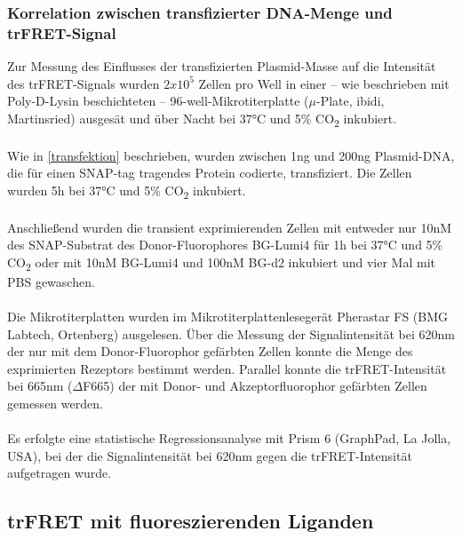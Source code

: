 \subsubsection{Korrelation zwischen transfizierter DNA-Menge und trFRET-Signal}
Zur Messung des Einflusses der transfizierten Plasmid-Masse auf die Intensität des trFRET-Signals wurden $2x10^5$ Zellen pro Well in einer -- wie beschrieben mit Poly-D-Lysin beschichteten -- 96-well-Mikrotiterplatte ($\mu$-Plate, ibidi, Martinsried) ausgesät und über Nacht bei 37\si{\celsius} und 5\% CO\textsubscript{2} inkubiert.
\\ \\
Wie in \ref{transfektion} beschrieben, wurden zwischen 1\si{\nano\gram} und 200\si{\nano\gram} Plasmid-DNA, die für einen SNAP-tag tragendes Protein codierte, transfiziert. Die Zellen wurden 5\si{\hour} bei 37\si{\celsius} und 5\% CO\textsubscript{2} inkubiert.
\\ \\
Anschließend wurden die transient exprimierenden Zellen mit entweder nur 10\si{\nano M} des SNAP-Substrat des Donor-Fluorophores BG-Lumi4 für 1\si{\hour} bei 37\si{\celsius} und 5\% CO\textsubscript{2} oder mit 10\si{\nano M} BG-Lumi4 und 100\si{\nano M} BG-d2 inkubiert und vier Mal mit PBS gewaschen.
\\ \\
Die Mikrotiterplatten wurden im Mikrotiterplattenlesegerät Pherastar FS (BMG Labtech, Ortenberg) ausgelesen. Über die Messung der Signalintensität bei 620\si{\nano\meter} der nur mit dem Donor-Fluorophor gefärbten Zellen konnte die Menge des exprimierten Rezeptors bestimmt werden. Parallel konnte die trFRET-Intensität bei 665\si{\nano\meter} ($\Delta$F665) der mit Donor- und Akzeptorfluorophor gefärbten Zellen gemessen werden.
\\ \\
Es erfolgte eine statistische Regressionsanalyse mit Prism 6 (GraphPad, La Jolla, USA), bei der die Signalintensität bei 620\si{\nano\meter} gegen die trFRET-Intensität aufgetragen wurde.

\subsection{trFRET mit fluoreszierenden Liganden}
